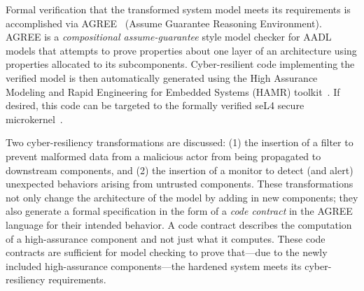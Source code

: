 Formal
verification that the transformed system model meets its requirements
is accomplished via AGREE~\cite{agree2013} (Assume Guarantee Reasoning
Environment).
AGREE is a {\em compositional assume-guarantee} style model checker
for AADL models that attempts to prove properties about one layer of
an architecture using properties allocated to its subcomponents.
Cyber-resilient code implementing the verified model is then
automatically generated using the High Assurance Modeling and Rapid
Engineering for Embedded Systems (HAMR) toolkit~\cite{hamr}.  If
desired, this code can be targeted to the formally verified seL4
secure microkernel~\cite{sel4-2009}.


Two cyber-resiliency transformations are discussed: (1) the insertion
of a filter to prevent malformed data from a malicious actor from
being propagated to downstream components, and (2) the insertion of a
monitor to detect (and alert) unexpected behaviors arising from
untrusted components. These transformations not only change the
architecture of the model by adding in new components; they also
generate a formal specification in the form of a \emph{code contract} in the AGREE language for their intended behavior. 
A code contract describes the computation of a high-assurance component and not just what it computes.
These code contracts
are sufficient for model checking to prove that---due to the newly
included high-assurance components---the hardened system meets its
cyber-resiliency requirements.

